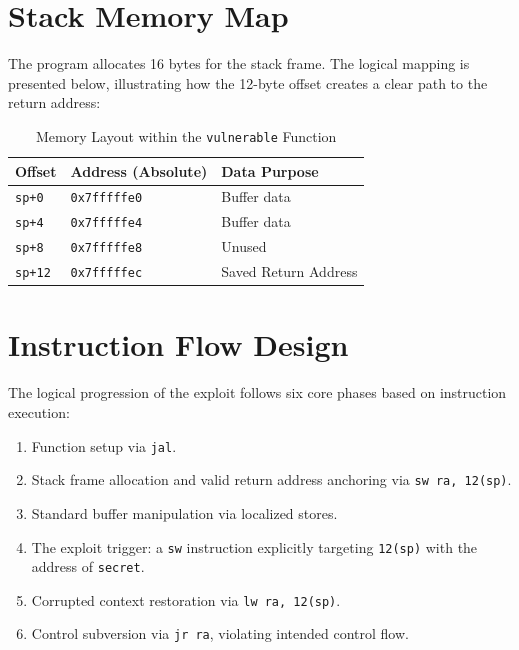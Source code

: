 \section{Stack Memory Map}
The program allocates 16 bytes for the stack frame. The logical mapping is presented below, illustrating how the 12-byte offset creates a clear path to the return address:

\begin{table}[h]
\caption{Memory Layout within the \texttt{vulnerable} Function}
\centering
\begin{tabular}{|l|l|l|}
\hline
\textbf{Offset} & \textbf{Address (Absolute)} & \textbf{Data Purpose} \\
\hline
\texttt{sp+0} & \texttt{0x7fffffe0} & Buffer data \\
\texttt{sp+4} & \texttt{0x7fffffe4} & Buffer data \\
\texttt{sp+8} & \texttt{0x7fffffe8} & Unused \\
\texttt{sp+12} & \texttt{0x7fffffec} & Saved Return Address \\
\hline
\end{tabular}
\label{tab:methodology_stack}
\end{table}

\section{Instruction Flow Design}
The logical progression of the exploit follows six core phases based on instruction execution:
\begin{enumerate}
    \item Function setup via \texttt{jal}.
    \item Stack frame allocation and valid return address anchoring via \texttt{sw ra, 12(sp)}.
    \item Standard buffer manipulation via localized stores.
    \item The exploit trigger: a \texttt{sw} instruction explicitly targeting \texttt{12(sp)} with the address of \texttt{secret}.
    \item Corrupted context restoration via \texttt{lw ra, 12(sp)}.
    \item Control subversion via \texttt{jr ra}, violating intended control flow.
\end{enumerate}

